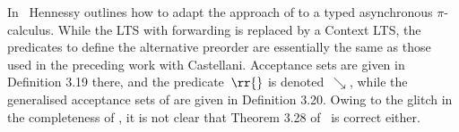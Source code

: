 In~\cite{DBLP:journals/jlp/Hennessy05} Hennessy outlines how to adapt the
approach of \cite{DBLP:conf/fsttcs/CastellaniH98} to a typed
asynchronous $\pi$-calculus. While the LTS with forwarding is
replaced by a Context LTS, the predicates to define the alternative
preorder are essentially the same as those used in the preceding work with
Castellani. Acceptance sets are given in Definition 3.19 there, and
the predicate~$\rr{}$ is denoted~$\searrow$, while the generalised
acceptance sets of \cite{DBLP:conf/fsttcs/CastellaniH98} are given in
Definition 3.20.  Owing to the glitch in the completeness of
\cite{DBLP:conf/fsttcs/CastellaniH98}, it is not clear that Theorem
3.28 of~\cite{DBLP:journals/jlp/Hennessy05} is correct either.


